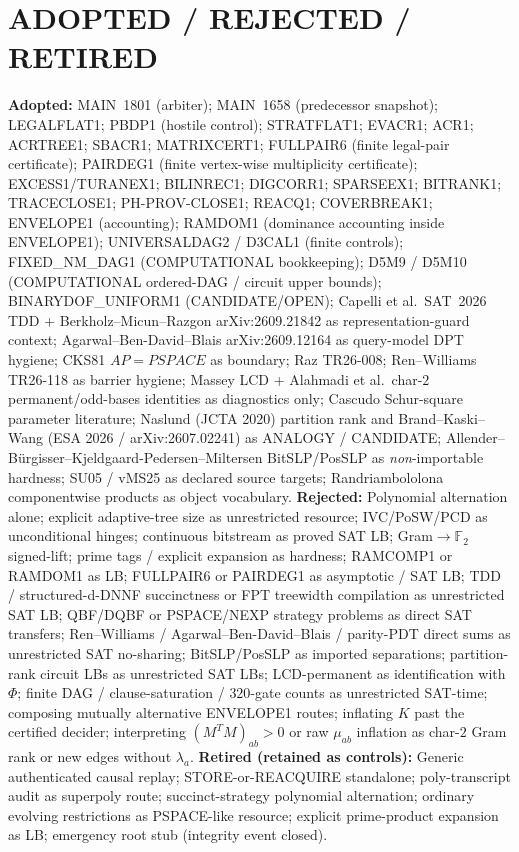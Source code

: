 \documentclass[11pt]{article}
\begin{document}
\section*{ADOPTED / REJECTED / RETIRED}
\textbf{Adopted:} MAIN~1801 (arbiter); MAIN~1658 (predecessor snapshot);
LEGALFLAT1; PBDP1 (hostile control); STRATFLAT1; EVACR1; ACR1; ACRTREE1; SBACR1;
MATRIXCERT1; FULLPAIR6 (finite legal-pair certificate); PAIRDEG1 (finite
vertex-wise multiplicity certificate); EXCESS1/TURANEX1; BILINREC1; DIGCORR1;
SPARSEEX1; BITRANK1; TRACECLOSE1; PH-PROV-CLOSE1; REACQ1; COVERBREAK1;
ENVELOPE1 (accounting); RAMDOM1 (dominance accounting inside ENVELOPE1);
UNIVERSALDAG2 / D3CAL1 (finite controls); FIXED\_NM\_DAG1 (COMPUTATIONAL
bookkeeping); D5M9 / D5M10 (COMPUTATIONAL ordered-DAG / circuit upper bounds);
BINARYDOF\_UNIFORM1 (CANDIDATE/OPEN); Capelli et al.\ SAT~2026 TDD +
Berkholz--Micun--Razgon arXiv:2609.21842 as representation-guard context;
Agarwal--Ben-David--Blais arXiv:2609.12164 as query-model DPT hygiene;
CKS81 $AP=PSPACE$ as boundary; Raz TR26-008; Ren--Williams TR26-118 as barrier
hygiene; Massey LCD + Alahmadi et al.\ char-$2$ permanent/odd-bases identities as
diagnostics only; Cascudo Schur-square parameter literature; Naslund (JCTA 2020)
partition rank and Brand--Kaski--Wang (ESA 2026 / arXiv:2607.02241) as ANALOGY /
CANDIDATE; Allender--B\"urgisser--Kjeldgaard-Pedersen--Miltersen BitSLP/PosSLP as
\emph{non}-importable hardness; SU05 / vMS25 as declared source targets;
Randriambololona componentwise products as object vocabulary.
\textbf{Rejected:} Polynomial alternation alone; explicit adaptive-tree size as
unrestricted resource; IVC/PoSW/PCD as unconditional hinges; continuous bitstream
as proved SAT LB; Gram$\to\mathbb F_2$ signed-lift; prime tags / explicit expansion
as hardness; RAMCOMP1 or RAMDOM1 as LB; FULLPAIR6 or PAIRDEG1 as asymptotic /
SAT LB; TDD / structured-d-DNNF succinctness or FPT treewidth compilation as
unrestricted SAT LB; QBF/DQBF or PSPACE/NEXP strategy problems as direct SAT
transfers; Ren--Williams / Agarwal--Ben-David--Blais / parity-PDT direct sums as
unrestricted SAT no-sharing; BitSLP/PosSLP as imported separations;
partition-rank circuit LBs as unrestricted SAT LBs; LCD-permanent as
identification with $\Phi$; finite DAG / clause-saturation / $320$-gate counts as
unrestricted SAT-time; composing mutually alternative ENVELOPE1 routes;
inflating $K$ past the certified decider; interpreting $(M^TM)_{ab}>0$ or raw
$\mu_{ab}$ inflation as char-$2$ Gram rank or new edges without $\lambda_a$.
\textbf{Retired (retained as controls):} Generic authenticated causal replay;
STORE-or-REACQUIRE standalone; poly-transcript audit as superpoly route;
succinct-strategy polynomial alternation; ordinary evolving restrictions as
PSPACE-like resource; explicit prime-product expansion as LB; emergency root stub
(integrity event closed).
\end{document}
